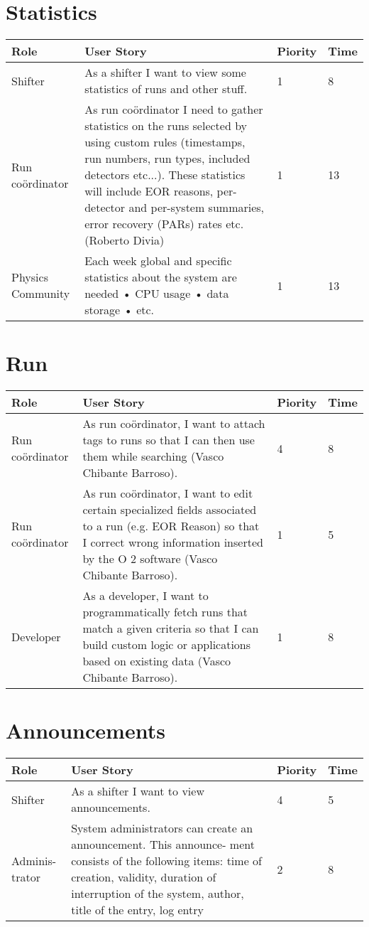 \section{Statistics}
\begin{longtable}{ | p{2cm} | p{8cm} | p{1.5cm} | l |}
\hline
Role & User Story & Piority & Time \\ \hline
Shifter &  As a shifter I want to view some statistics of runs and other stuff. & 1 & 8 \\ \hline
Run coördinator &  As run coördinator I need to gather statistics on the runs selected by using custom rules (timestamps, run numbers, run types, included detectors etc...). These statistics will include EOR reasons, per-detector and per-system summaries, error recovery (PARs) rates etc.(Roberto Divia) & 1 & 13 \\ \hline
Physics Community &  Each week global and specific statistics about the system are needed
• CPU usage
• data storage
• etc. & 1 & 13 \\ \hline


\end{longtable}

\section{Run}
\begin{longtable}{ | p{2cm} | p{8cm} | p{1.5cm} | l |}
\hline
Role & User Story & Piority & Time \\ \hline
Run coördinator &  As run coördinator, I want to attach tags to runs so that I can then use them while searching (Vasco Chibante Barroso). & 4 & 8 \\ \hline
Run coördinator &  As run coördinator, I want to edit certain specialized fields associated to a run (e.g. EOR Reason) so that I correct wrong information inserted by the O 2 software (Vasco Chibante Barroso). & 1 & 5 \\ \hline
Developer &  As a developer, I want to programmatically fetch runs that match a
given criteria so that I can build custom logic or applications based on
existing data (Vasco Chibante Barroso). & 1 & 8 \\ \hline
\end{longtable}
\newpage
\section{Announcements}
\begin{longtable}{ | p{2cm} | p{8cm} | p{1.5cm} | l |}
\hline
Role & User Story & Piority & Time \\ \hline
Shifter &  As a shifter I want to view announcements. & 4 & 5 \\ \hline
Adminis-trator & System administrators can create an announcement. This announce-
ment consists of the following items: time of creation, validity, duration of interruption of the system, author, title of the entry, log entry & 2 & 8 \\ \hline
\end{longtable}

